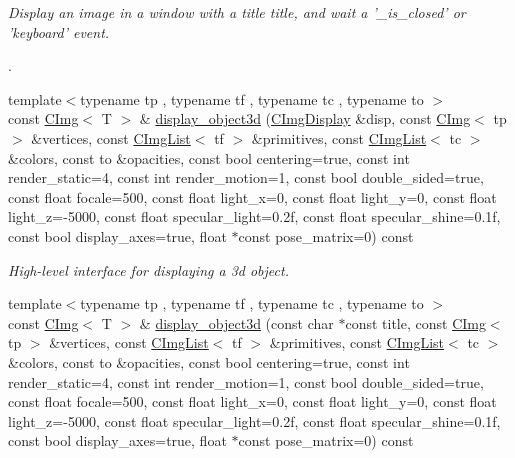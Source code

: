 \begin{DoxyCompactItemize}
\begin{DoxyCompactList}\small\item\em Display an image in a window with a title {\ttfamily title}, and wait a '\_\-is\_\-closed' or 'keyboard' event.\par
. \item\end{DoxyCompactList}\item 
\hypertarget{structcimg__library_1_1CImg_ac8b2817d4dd6c2c8283c2c19861de056}{
{\footnotesize template$<$typename tp , typename tf , typename tc , typename to $>$ }\\const \hyperlink{structcimg__library_1_1CImg}{CImg}$<$ T $>$ \& \hyperlink{structcimg__library_1_1CImg_ac8b2817d4dd6c2c8283c2c19861de056}{display\_\-object3d} (\hyperlink{structcimg__library_1_1CImgDisplay}{CImgDisplay} \&disp, const \hyperlink{structcimg__library_1_1CImg}{CImg}$<$ tp $>$ \&vertices, const \hyperlink{structcimg__library_1_1CImgList}{CImgList}$<$ tf $>$ \&primitives, const \hyperlink{structcimg__library_1_1CImgList}{CImgList}$<$ tc $>$ \&colors, const to \&opacities, const bool centering=true, const int render\_\-static=4, const int render\_\-motion=1, const bool double\_\-sided=true, const float focale=500, const float light\_\-x=0, const float light\_\-y=0, const float light\_\-z=-\/5000, const float specular\_\-light=0.2f, const float specular\_\-shine=0.1f, const bool display\_\-axes=true, float $\ast$const pose\_\-matrix=0) const }
\label{structcimg__library_1_1CImg_ac8b2817d4dd6c2c8283c2c19861de056}

\begin{DoxyCompactList}\small\item\em High-\/level interface for displaying a 3d object. \item\end{DoxyCompactList}\item 
\hypertarget{structcimg__library_1_1CImg_a31eee27192384e9b6723e10be79fc028}{
{\footnotesize template$<$typename tp , typename tf , typename tc , typename to $>$ }\\const \hyperlink{structcimg__library_1_1CImg}{CImg}$<$ T $>$ \& \hyperlink{structcimg__library_1_1CImg_a31eee27192384e9b6723e10be79fc028}{display\_\-object3d} (const char $\ast$const title, const \hyperlink{structcimg__library_1_1CImg}{CImg}$<$ tp $>$ \&vertices, const \hyperlink{structcimg__library_1_1CImgList}{CImgList}$<$ tf $>$ \&primitives, const \hyperlink{structcimg__library_1_1CImgList}{CImgList}$<$ tc $>$ \&colors, const to \&opacities, const bool centering=true, const int render\_\-static=4, const int render\_\-motion=1, const bool double\_\-sided=true, const float focale=500, const float light\_\-x=0, const float light\_\-y=0, const float light\_\-z=-\/5000, const float specular\_\-light=0.2f, const float specular\_\-shine=0.1f, const bool display\_\-axes=true, float $\ast$const pose\_\-matrix=0) const }
\label{structcimg__library_1_1CImg_a31eee27192384e9b6723e10be79fc028}


\end{DoxyCompactItemize}
